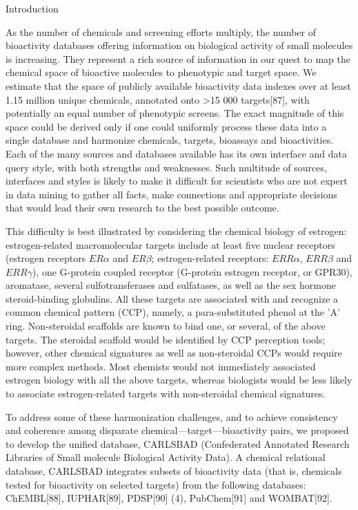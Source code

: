 Introduction

As the number of chemicals and screening efforts multiply, the number of bioactivity databases offering information on biological activity of small molecules is increasing. They represent a rich source of information in our quest to map the chemical space of bioactive molecules to phenotypic and target space. We estimate that the space of publicly available bioactivity data indexes over at least 1.15 million unique chemicals, annotated onto >15 000 targets[87], with potentially an equal number of phenotypic screens. The exact magnitude of this space could be derived only if one could uniformly process these data into a single database and harmonize chemicals, targets, bioassays and bioactivities. Each of the many sources and databases available has its own interface and data query style, with both strengths and weaknesses. Such multitude of sources, interfaces and styles is likely to make it difficult for scientists who are not expert in data mining to gather all facts, make connections and appropriate decisions that would lead their own research to the best possible outcome.

This difficulty is best illustrated by considering the chemical biology of estrogen: estrogen-related macromolecular targets include at least five nuclear receptors (estrogen receptors $ER\alpha$ and $ER\beta$; estrogen-related receptors: $ERR\alpha$, $ERR\beta$ and $ERR\gamma$), one G-protein coupled receptor (G-protein estrogen receptor, or GPR30), aromatase, several sulfotransferases and sulfatases, as well as the sex hormone steroid-binding globulins. All these targets are associated with and recognize a common chemical pattern (CCP), namely, a para-substituted phenol at the 'A' ring. Non-steroidal scaffolds are known to bind one, or several, of the above targets. The steroidal scaffold would be identified by CCP perception tools; however, other chemical signatures as well as non-steroidal CCPs would require more complex methods. Most chemists would not immediately associated estrogen biology with all the above targets, whereas biologists would be less likely to associate estrogen-related targets with non-steroidal chemical signatures.

To address some of these harmonization challenges, and to achieve consistency and coherence among disparate chemical—target—bioactivity pairs, we proposed to develop the unified database, CARLSBAD (Confederated Annotated Research Libraries of Small molecule Biological Activity Data). A chemical relational database, CARLSBAD integrates subsets of bioactivity data (that is, chemicals tested for bioactivity on selected targets) from the following databases: ChEMBL[88], IUPHAR[89], PDSP[90] (4), PubChem[91] and WOMBAT[92].


